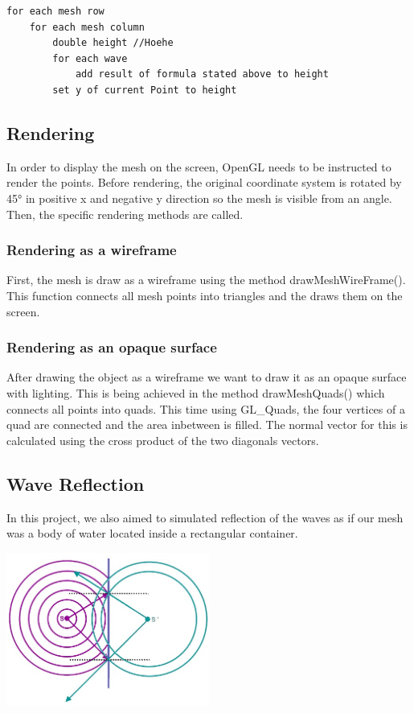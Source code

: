 \documentclass[12pt,a4paper]{scrartcl}
\begin{document}
\begin{lstlisting}[language=PSEUDO]
for each mesh row
	for each mesh column
		double height //Hoehe
		for each wave
			add result of formula stated above to height
		set y of current Point to height
\end{lstlisting}

\subsection{Rendering}
In order to display the mesh on the screen, OpenGL needs to be instructed to render the points. Before rendering, the original coordinate system is rotated by 45° in positive x and negative y direction so the mesh is visible from an angle. Then, the specific rendering methods are called.

\subsubsection{Rendering as a wireframe}
First, the mesh is draw as a wireframe using the method drawMeshWireFrame(). This function connects all mesh points into triangles and the draws them on the screen.

\subsubsection{Rendering as an opaque surface}
After drawing the object as a wireframe we want to draw it as an opaque surface with lighting. This is being achieved in the method drawMeshQuads() which connects all points into quads. This time using GL_Quads, the four vertices of a quad are connected and the area inbetween is filled. The normal vector for this is calculated using the cross product of the two diagonals vectors.

\subsection{Wave Reflection}
In this project, we also aimed to simulated reflection of the waves as if our mesh was a body of water located inside a rectangular container.

\begin{center}
	\includegraphics[width=0.5\textwidth]{Images/Reflection.jpg}
\end{center}
\end{document}
